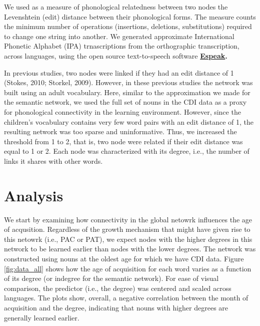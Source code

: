 \documentclass[10pt, letterpaper]{article}
\begin{document}
We used as a measure of phonological relatedness between two nodes the
Levenshtein (edit) distance between their phonological forms. The
measure counts the minimum number of operations (insertions, deletions,
substitutions) required to change one string into another. We generated
approximate International Phonetic Alphabet (IPA) trnascriptions from
the orthographic transcription, across languages, using the open source
text-to-speech software
\textbf{\href{http://http://espeak.sourceforge.net/}{Espeak}.}

In previous studies, two nodes were linked if they had an edit distance
of 1 (Stokes, 2010; Storkel, 2009). However, in these previous studies
the network was built using an adult vocabulary. Here, similar to the
approximation we made for the semantic network, we used the full set of
nouns in the CDI data as a proxy for phonological connectivity in the
learning environment. However, since the children's vocabulary contains
very few word pairs with an edit distance of 1, the resulting network
was too sparse and uninformative. Thus, we increased the threshold from
1 to 2, that is, two node were related if their edit distance was equal
to 1 or 2. Each node was characterized with its degree, i.e., the number
of links it shares with other words.

\section{Analysis}\label{analysis}

We start by examining how connectivity in the global netowrk influences
the age of acqusition. Regardless of the growth mechanism that might
have given rise to this netowrk (i.e., PAC or PAT), we expect nodes with
the higher degrees in this network to be learned earlier than nodes with
the lower degrees. The network was constructed using nouns at the oldest
age for which we have CDI data. Figure \ref{fig:data_all} shows how the
age of acquisition for each word varies as a function of its degree (or
indegree for the semantic network). For ease of visual comparison, the
predictor (i.e., the degree) was centered and scaled across languages.
The plots show, overall, a negative correlation between the month of
acquisition and the degree, indicating that nouns with higher degrees
are generally learned earlier.
\end{document}
